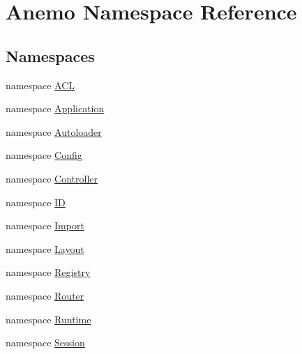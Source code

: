 \hypertarget{namespace_anemo}{
\section{Anemo Namespace Reference}
\label{namespace_anemo}
}
\subsection*{Namespaces}
\begin{DoxyCompactItemize}
\item 
namespace \hyperlink{namespace_anemo_1_1_a_c_l}{ACL}
\item 
namespace \hyperlink{namespace_anemo_1_1_application}{Application}
\item 
namespace \hyperlink{namespace_anemo_1_1_autoloader}{Autoloader}
\item 
namespace \hyperlink{namespace_anemo_1_1_config}{Config}
\item 
namespace \hyperlink{namespace_anemo_1_1_controller}{Controller}
\item 
namespace \hyperlink{namespace_anemo_1_1_i_d}{ID}
\item 
namespace \hyperlink{namespace_anemo_1_1_import}{Import}
\item 
namespace \hyperlink{namespace_anemo_1_1_layout}{Layout}
\item 
namespace \hyperlink{namespace_anemo_1_1_registry}{Registry}
\item 
namespace \hyperlink{namespace_anemo_1_1_router}{Router}
\item 
namespace \hyperlink{namespace_anemo_1_1_runtime}{Runtime}
\item 
namespace \hyperlink{namespace_anemo_1_1_session}{Session}
\end{DoxyCompactItemize}
